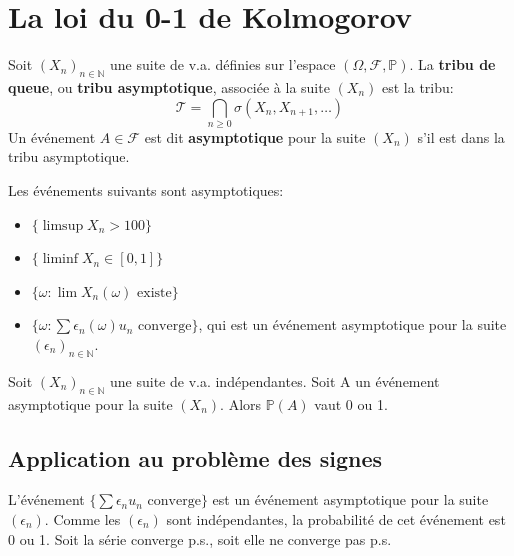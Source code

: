 \section{La loi du 0-1 de Kolmogorov}
\begin{definition}
Soit $(X_n)_{n \in \mathbb{N}}$ une suite de v.a. définies sur l'espace $(\Omega, \mathcal{F}, \mathbb{P})$.
La \textbf{tribu de queue}, ou \textbf{tribu asymptotique}, associée à la suite $(X_n)$ est la tribu:
\[ \mathcal{T} = \bigcap_{n \ge 0} \sigma(X_n, X_{n+1}, \dots) \]
Un événement $A \in \mathcal{F}$ est dit \textbf{asymptotique} pour la suite $(X_n)$ s'il est dans la tribu asymptotique.
\end{definition}
\begin{example}
Les événements suivants sont asymptotiques:
\begin{itemize}
    \item $\{ \limsup X_n > 100 \}$
    \item $\{ \liminf X_n \in [0,1] \}$
    \item $\{ \omega : \lim X_n(\omega) \text{ existe} \}$
    \item $\{ \omega : \sum \epsilon_n(\omega) u_n \text{ converge} \}$, qui est un événement asymptotique pour la suite $(\epsilon_n)_{n \in \mathbb{N}}$.
\end{itemize}
\end{example}
\begin{theorem}
Soit $(X_n)_{n \in \mathbb{N}}$ une suite de v.a. indépendantes.
Soit A un événement asymptotique pour la suite $(X_n)$. Alors $\mathbb{P}(A)$ vaut 0 ou 1.
\end{theorem}
\subsection*{Application au problème des signes}
L'événement $\{\sum \epsilon_n u_n \text{ converge}\}$ est un événement asymptotique pour la suite $(\epsilon_n)$. Comme les $(\epsilon_n)$ sont indépendantes, la probabilité de cet événement est 0 ou 1.
Soit la série converge p.s., soit elle ne converge pas p.s.
